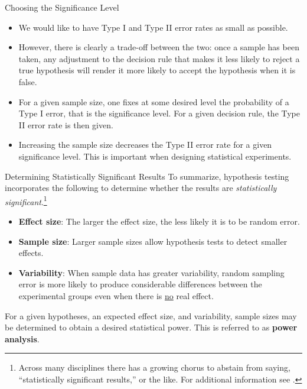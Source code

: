 \documentclass[pdf]{beamer}
\newcommand{\empr}[1]{{\color{franklinblue}\textbf{#1}}}
\theoremstyle{remark}
\theoremstyle{definition}
\begin{document}
\begin{frame}[t]{Choosing the Significance Level}
\begin{itemize}
    \item We would like to have Type I and Type II error rates as small as possible. 
    \item However, there is clearly a trade-off between the two: once a sample has been taken, any adjustment to the decision rule that makes it less likely to reject a true hypothesis will render it more likely to accept the hypothesis when it is false.
    \item For a given sample size, one fixes at some desired level the probability of a Type I error, that is the significance level.  For a given decision rule, the Type II error rate is then given.
    \item Increasing the sample size decreases the Type II error rate for a given significance level.  This is important when designing statistical experiments.  
\end{itemize}
\end{frame}

\begin{frame}[t]{Determining Statistically Significant Results}
To summarize, hypothesis testing incorporates the following to determine whether the results are \textit{statistically significant}.\footnote{Across many disciplines there has a growing chorus to abstain from saying, ``statistically significant results,'' or the like. For additional information see \cite{wasserstein2019}. }  \\
\vspace{0.5ex}
\small
\begin{itemize}
\item \empr{Effect size}: The larger the effect size, the less likely it is to be random error.
\item \empr{Sample size}: Larger sample sizes allow hypothesis tests to detect smaller effects. 
\item \empr{Variability}: When sample data has greater variability, random sampling error is more likely to produce considerable differences between the experimental groups even when there is \underline{no} real effect. 
\end{itemize} 
\normalsize
\vspace{-2.0ex}
For a given hypotheses, an expected effect size, and variability, sample sizes may be determined to obtain a desired statistical power.  This is referred to as \empr{power analysis}.
\end{frame}
\end{document}
